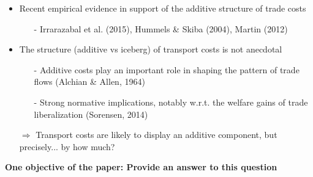 \documentclass[10 pt,Helvetica, french]{beamer}
\begin{document}
\begin{frame}
\begin{itemize}
\item Recent empirical evidence in support of the additive structure of trade costs \vspace{0.1cm}
\begin{itemize}
\item[-] Irrarazabal et al. (2015), Hummels \& Skiba (2004), Martin (2012)  \vspace{0.2cm}
\end{itemize}
\item The structure (additive vs iceberg) of transport costs is not anecdotal \vspace{0.1cm}
\begin{itemize}
\item[-] Additive costs play an important role in shaping the pattern of trade flows (Alchian \& Allen, 1964) \vspace{0.1cm}
\item[-] Strong normative implications, notably w.r.t. the welfare gains of trade liberalization (Sorensen, 2014)\vspace{0.1cm}

\end{itemize}
\item[$\Rightarrow$] Transport costs are likely to display an additive component, but precisely... by how much? \vspace{0.2cm}
\end{itemize}
\textbf{One objective of the paper: Provide an answer to this question}

\end{frame}
\end{document}
